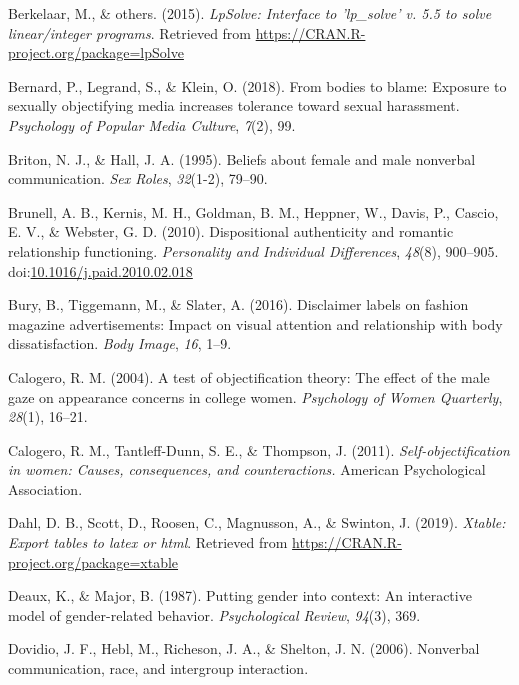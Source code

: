 \documentclass[man]{apa6}
\begin{document}
\hypertarget{ref-R-lpSolve}{}
Berkelaar, M., \& others. (2015). \emph{LpSolve: Interface to
'lp\_solve' v. 5.5 to solve linear/integer programs}. Retrieved from
\url{https://CRAN.R-project.org/package=lpSolve}

\hypertarget{ref-bernard2018bodies}{}
Bernard, P., Legrand, S., \& Klein, O. (2018). From bodies to blame:
Exposure to sexually objectifying media increases tolerance toward
sexual harassment. \emph{Psychology of Popular Media Culture},
\emph{7}(2), 99.

\hypertarget{ref-briton1995}{}
Briton, N. J., \& Hall, J. A. (1995). Beliefs about female and male
nonverbal communication. \emph{Sex Roles}, \emph{32}(1-2), 79--90.

\hypertarget{ref-brunelletal2010}{}
Brunell, A. B., Kernis, M. H., Goldman, B. M., Heppner, W., Davis, P.,
Cascio, E. V., \& Webster, G. D. (2010). Dispositional authenticity and
romantic relationship functioning. \emph{Personality and Individual
Differences}, \emph{48}(8), 900--905.
doi:\href{https://doi.org/10.1016/j.paid.2010.02.018}{10.1016/j.paid.2010.02.018}

\hypertarget{ref-bury2016}{}
Bury, B., Tiggemann, M., \& Slater, A. (2016). Disclaimer labels on
fashion magazine advertisements: Impact on visual attention and
relationship with body dissatisfaction. \emph{Body Image}, \emph{16},
1--9.

\hypertarget{ref-calogero2004test}{}
Calogero, R. M. (2004). A test of objectification theory: The effect of
the male gaze on appearance concerns in college women. \emph{Psychology
of Women Quarterly}, \emph{28}(1), 16--21.

\hypertarget{ref-calogero2011}{}
Calogero, R. M., Tantleff-Dunn, S. E., \& Thompson, J. (2011).
\emph{Self-objectification in women: Causes, consequences, and
counteractions.} American Psychological Association.

\hypertarget{ref-R-xtable}{}
Dahl, D. B., Scott, D., Roosen, C., Magnusson, A., \& Swinton, J.
(2019). \emph{Xtable: Export tables to latex or html}. Retrieved from
\url{https://CRAN.R-project.org/package=xtable}

\hypertarget{ref-deaux1987putting}{}
Deaux, K., \& Major, B. (1987). Putting gender into context: An
interactive model of gender-related behavior. \emph{Psychological
Review}, \emph{94}(3), 369.

\hypertarget{ref-dovidio2006nonverbal}{}
Dovidio, J. F., Hebl, M., Richeson, J. A., \& Shelton, J. N. (2006).
Nonverbal communication, race, and intergroup interaction.
\end{document}
